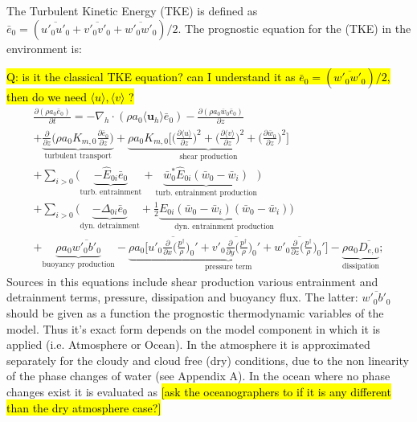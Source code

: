\documentclass{report}
\begin{document}
The Turbulent Kinetic Energy (TKE) is defined as $\bar{e}_0 = (\overline{u'_0 u'_0} + \overline{v'_0 v'_0} + \overline{w'_0 w'_0})/2$. The prognostic equation for the (TKE) in the environment is:

\hl{Q: is it the classical TKE equation? can I understand it as $\bar{e}_0 = (\overline{w'_0 w'_0})/2$,  then do we need $\langle u \rangle, \langle v \rangle$ ?} 
\begin{multline}
\frac{\partial (\rho a_0 \bar{e}_0)}{\partial t} =
- \nabla_h \cdot (\rho a_0 \langle \mathbf{u}_h \rangle \bar{e}_0) - \frac{\partial (\rho a_0 \overline{w}_0 \bar{e}_0)}{\partial z}\\
+ \underbrace{ \frac{\partial}{\partial z}\Bigg(\rho a_0 K_{m,0} \frac{\partial\bar{e}_0}{\partial z} \Bigg)}_{\text{turbulent transport}} +
\underbrace{\rho a_0 K_{m,0} \Bigg[ \Bigg(\frac{\partial \langle u \rangle}{\partial z}\Bigg)^2 + \Bigg(\frac{\partial \langle v \rangle}{\partial z}\Bigg)^2 + \Bigg(\frac{\partial \bar{w}_0}{\partial z}\Bigg)^2\Bigg]}_{\text{shear production}} \\
+\sum_{i>0}{\Big(\underbrace{-\hat{E}_{0i} \bar{e}_0}_{\text{turb. entrainment}} + \underbrace{\bar{w}^*_0\hat{E}_{0i}(\bar{w}_0-\bar{w}_i)}_{\text{turb. entrainment production}}} \Big) \\ 
+ \sum_{i>0}{\Big(\underbrace{- \Delta_{0i} \bar{e}_0}_{\text{dyn. detrainment}} 
+ \frac{1}{2}\underbrace{E_{0i} (\bar{w}_0 -\bar{w}_i) (\bar{w}_0 -\bar{w}_i)}_{\text{dyn. entrainment production}}} \Big) \\
+ \underbrace{\rho a_0\overline{w'_0 b'_0}}_{\text{buoyancy production}} - \underbrace{\rho a_0\Bigg[\overline{u'_0\frac{\partial }{\partial x}\Bigg( \frac{p^\dagger}{\rho}\Bigg)_0'} + \overline{v'_0\frac{\partial}{\partial y} \Bigg( \frac{p^\dagger}{\rho}\Bigg)_0'}+ \overline{w'_0\frac{\partial}{\partial z} \Bigg( \frac{p^\dagger}{\rho}\Bigg)_0'}  \Bigg] }_{\text{pressure term}} - \underbrace{ \rho a_0 \overline{D_{e, 0}}}_{\text{dissipation}};
\label{eq:tke_equation} 
\end{multline}
Sources in this equations include shear production various entrainment and detrainment terms, pressure, dissipation and buoyancy flux. The latter: $\overline{w'_0 b'_0}$ should be given as a function the prognostic thermodynamic variables of the model. Thus it's exact form depends on the model component in which it is applied (i.e. Atmosphere or Ocean). In the atmosphere it is approximated separately for the cloudy and cloud free (dry) conditions, due to the non linearity of the phase changes of water (see Appendix A). In the ocean where no phase changes exist it is evaluated as \hl{[ask the oceanographers to if it is any different than the dry atmosphere case?]}
\end{document}
